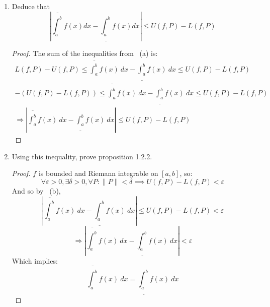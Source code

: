 \documentclass{article}
\newcommand{\vep}{\varepsilon}
\newcommand{\<}{\langle}
\renewcommand{\>}{\rangle}
\newcommand{\norm}[1]{\lVert #1 \rVert}
\newcommand{\lowint}[2]{\underline{\int_{#1}^{#2}}}
\newcommand{\upint}[2]{\overline{\int_{#1}^{#2}}}
\begin{document}
\begin{enumerate}[(E1)]
\begin{enumerate}
    $$ L(f,P) \leq \upint{a}{b} f(x)dx \leq U(f,P)$$
    $$-U(f,P) \leq -\lowint{a}{b} f(x)dx \leq -L(f,P)$$
    \begin{proof}
        Proposition 1.2.1:
        $\forall P_{A}, P_{B}$ partitions of $[a, b],$ we have
$$
L\left(f, P_{B}\right) \leq \lowint{a}{b} f(x)\ dx \leq \upint{a}{b} f(x)\ dx \leq U\left(f, P_{A}\right)
$$
By the proposition:
$$L\left(f, P_{B}\right) \leq \upint{a}{b} f(x)\ dx \leq U\left(f, P_{A}\right) \text{ and } L\left(f, P_{B}\right) \leq \lowint{a}{b} f(x)\ dx \leq U\left(f, P_{A}\right)$$
$$-\left(L\left(f, P_{B}\right) \leq \lowint{a}{b} f(x)\ dx \leq U\left(f, P_{A}\right)\right) \implies -U\left(f, P_A\right) \leq -\lowint{a}{b}f(x)\ dx \leq -L\left(f, P_B\right)$$
So:
$$L\left(f, P_{B}\right) \leq \upint{a}{b} f(x)\ dx \leq U\left(f, P_{A}\right) \text{ and } -U\left(f, P_A\right) \leq -\lowint{a}{b}f(x)\ dx \leq -L\left(f, P_B\right)$$
    \end{proof}
    \item 
    Deduce that 
    $$ \left| \upint{a}{b}f(x)dx - \lowint{a}{b}f(x)dx \right| \leq U(f,P) - L(f,P)$$    
    \begin{proof}
	The sum of the inequalities from ~(a) is:
	\begin{align*}
	L\left(f, P\right) - U\left(f, P\right) \leq \upint{a}{b}f(x)\ dx - \lowint{a}{b}f(x)\ dx \leq U\left(f, P\right) - L\left(f, P\right) \\
	-\left(U\left(f, P\right) - L\left(f, P\right)\right) \leq \upint{a}{b}f(x)\ dx - \lowint{a}{b}f(x)\ dx \leq U\left(f, P\right) - L\left(f, P\right) \\
	\Rightarrow \left|\upint{a}{b}f(x)\ dx - \lowint{a}{b}f(x)\ dx\right| \leq U\left(f, P\right) - L\left(f, P\right)
	\end{align*}
    \end{proof}
    \item Using this inequality, prove proposition 1.2.2.
    \begin{proof}
    $f$ is bounded and Riemann integrable on $[a,b]$, so:
    $$\forall \vep > 0, \exists \delta > 0, \forall P: \norm{P} < \delta \implies U\left(f, P\right) - L\left(f, P\right) < \vep$$
    And so by ~(b),
    $$\left|\upint{a}{b}f(x)\ dx - \lowint{a}{b}f(x)\ dx\right| \leq U\left(f, P\right) - L\left(f, P\right) < \vep$$
    $$\Rightarrow \left|\upint{a}{b}f(x)\ dx - \lowint{a}{b}f(x)\ dx\right| < \vep$$
    Which implies:
    $$\upint{a}{b}f(x)\ dx = \lowint{a}{b}f(x)\ dx$$
    \end{proof}


\end{enumerate}
\end{enumerate}
\end{document}
